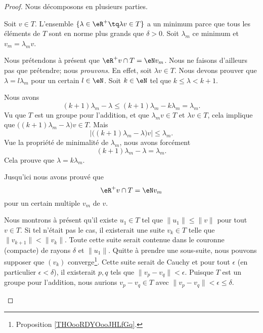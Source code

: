 \begin{proof}
	Nous décomposons en plusieurs parties.

	\begin{subproof}
		\spitem[\( \eR^+v\cap T=\eN v_m\)]
		Soit \( v\in T\). L'ensemble \( \{ \lambda \in \eR^+\tq \lambda v\in T\}\) a un minimum parce que tous les éléments de \( T\) sont en norme plus grands que \( \delta>0\). Soit \( \lambda_m\) ce minimum et \( v_m=\lambda_mv\).

		Nous prétendons à présent que \( \eR^+v\cap T=\eN v_m\). Nous ne faisons d'ailleurs pas que prétendre; nous \emph{prouvons}. En effet, soit \( \lambda v\in T\). Nous devons prouver que \( \lambda = l\lambda_m\) pour un certain \( l\in \eN\). Soit \( k\in \eN\) tel que \( k\leq \lambda<k+1\).

		Nous avons
		\begin{equation}
			(k+1)\lambda_m-\lambda\leq (k+1)\lambda_m-k\lambda_m=\lambda_m.
		\end{equation}
		Vu que \( T\) est un groupe pour l'addition, et que \( \lambda_mv\in T\) et \( \lambda v\in T\), cela implique que \( \big( (k+1)\lambda_m-\lambda \big)v\in T\). Mais
		\begin{equation}
			| \big( (k+1)\lambda_m-\lambda \big)v |\leq \lambda_m.
		\end{equation}
		Vue la propriété de minimalité de \( \lambda_m\), nous avons forcément
		\begin{equation}
			(k+1)\lambda_m-\lambda = \lambda_m.
		\end{equation}
		Cela prouve que \( \lambda=k\lambda_m\).

		Jusqu'ici nous avons prouvé que
		\begin{equation}
			\eR^+v\cap T=\eN v_m
		\end{equation}
		pour un certain multiple \( v_m\) de \( v\).


		Nous montrons à présent qu'il existe \( u_1\in T\) tel que \( \| u_1 \|\leq \| v \|\) pour tout \( v\in T\). Si tel n'était pas le cas, il existerait une suite \( v_k\in T\) telle que \( \| v_{k+1} \|<\| v_k \|\). Toute cette suite serait contenue dans le couronne (compacte) de rayons \( \delta\) et \( \| u_1 \|\). Quitte à prendre une sous-suite, nous pouvons supposer que \( (v_k)\) converge\footnote{Proposition \ref{THOooRDYOooJHLfGq}.}. Cette suite serait de Cauchy et pour tout \( \epsilon\) (en particulier \( \epsilon<\delta\)), il existerait \( p,q\) tels que \( \| v_p-v_q \|<\epsilon\). Puisque \( T\) est un groupe pour l'addition, nous aurions \( v_p-v_q\in T\) avec \( \| v_p-v_q \|<\epsilon\leq \delta\).


\end{subproof}
\end{proof}
